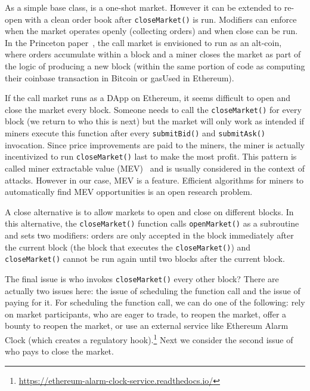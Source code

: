 As a simple base class, \cm is a one-shot market. However it can be extended to re-open with a clean order book after \texttt{closeMarket()} is run. Modifiers can enforce when the market operates openly (collecting orders) and when close can be run. In the Princeton paper~\cite{clark2014decentralizing}, the call market is envisioned to run as an alt-coin, where orders accumulate within a block and a miner closes the market as part of the logic of producing a new block (\ie within the same portion of code as computing their coinbase transaction in Bitcoin or gasUsed in Ethereum). 

If the call market runs as a DApp on Ethereum, it seems difficult to open and close the market every block. Someone needs to call the \texttt{closeMarket()} for every block (we return to who this is next) but the market will only work as intended if miners execute this function after every \texttt{submitBid()} and \texttt{submitAsk()} invocation. Since price improvements are paid to the miners, the miner is actually incentivized to run \texttt{closeMarket()} last to make the most profit. This pattern is called miner extractable value (MEV)~\cite{daian2019flash} and is usually considered in the context of attacks. However in our case, MEV is a feature. Efficient algorithms for miners to automatically find MEV opportunities is an open research problem.

A close alternative is to allow markets to open and close on different blocks. In this alternative, the \texttt{closeMarket()} function calls \texttt{openMarket()} as a subroutine and sets two modifiers: orders are only accepted in the block immediately after the current block (\ie the block that executes the \texttt{closeMarket()}) and \texttt{closeMarket()} cannot be run again until two blocks after the current block. 

The final issue is who invokes \texttt{closeMarket()} every other block? There are actually two issues here: the issue of scheduling the function call and the issue of paying for it. For scheduling the function call, we can do one of the following: rely on market participants, who are eager to trade, to reopen the market, offer a bounty to reopen the market, or use an external service like Ethereum Alarm Clock (which creates a regulatory hook).\footnote{\url{https://ethereum-alarm-clock-service.readthedocs.io/}} Next we consider the second issue of who pays to close the market. 


